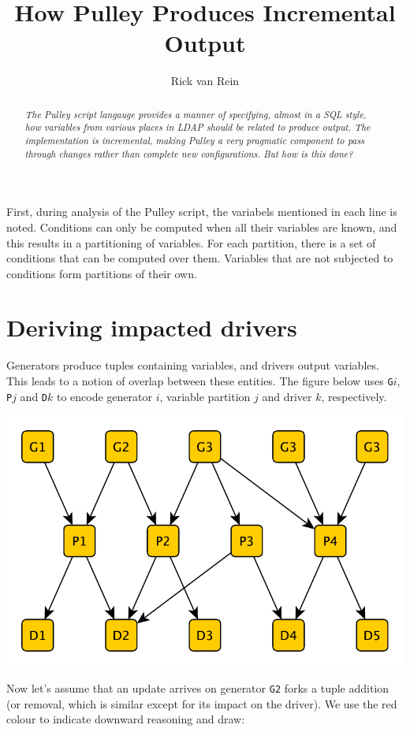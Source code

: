 \documentclass[a4paper]{article}
\def\G#1{\texttt{G#1}\xspace}
\def\P#1{\texttt{P#1}\xspace}
\def\D#1{\texttt{D#1}\xspace}
\begin{document}
\title{How Pulley Produces Incremental Output}
\author{Rick van Rein}
\maketitle
\begin{abstract}\noindent\em
The Pulley script langauge provides a manner of specifying, almost in a SQL style, how variables from various places in LDAP should be related to produce output.  The implementation is incremental, making Pulley a very pragmatic component to pass through changes rather than complete new configurations.  But how is this done?
\end{abstract}

First, during analysis of the Pulley script, the variabels mentioned in each line is noted.  Conditions can only be computed when all their variables are known, and this results in a partitioning of variables.  For each partition, there is a set of conditions that can be computed over them.  Variables that are not subjected to conditions form partitions of their own.


\section{Deriving impacted drivers}

Generators produce tuples containing variables, and drivers output variables.  This leads to a notion of overlap between these entities.  The figure below uses \G{$i$}, \P{$j$} and \D{$k$} to encode generator $i$, variable partition $j$ and driver $k$, respectively.

\centerline{\includegraphics[scale=0.5]{img/network0-varoverlap.pdf}}

Now let's assume that an update arrives on generator \G2 forks a tuple addition (or removal, which is similar except for its impact on the driver).  We use the red colour to indicate downward reasoning and draw:
\end{document}
